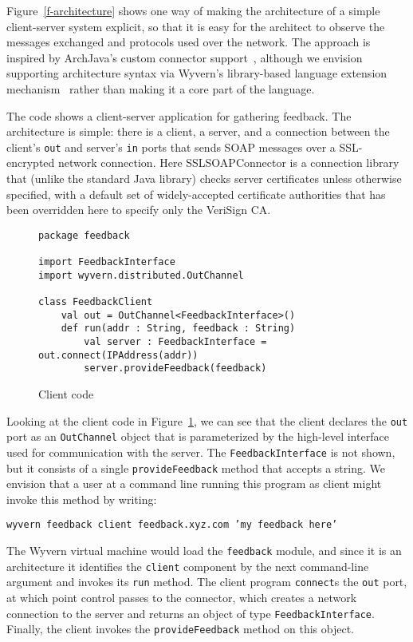 \documentclass[runningheads]{llncs}
\begin{document}
\begin{sloppypar}
Figure~\ref{f-architecture} shows one way of making the architecture of a simple client-server system explicit, so that it is easy for the architect to observe the messages exchanged and protocols used over the network.  The approach is inspired by ArchJava's custom connector support~\cite{ASCN03}, although we envision supporting architecture syntax via Wyvern's library-based language extension mechanism~\cite{TSLs-ECOOP14} rather than making it a core part of the language.

The code shows a client-server application for gathering feedback.  The architecture is simple: there is a client, a server, and a connection between the client's \texttt{out} and server's \texttt{in} ports that sends SOAP messages over a SSL-encrypted network connection.  Here SSLSOAPConnector is a connection library that (unlike the standard Java library) checks server certificates unless otherwise specified, with a default set of widely-accepted certificate authorities that has been overridden here to specify only the VeriSign CA.



\begin{figure}[t]
\begin{lstlisting}
package feedback

import FeedbackInterface
import wyvern.distributed.OutChannel

class FeedbackClient
    val out = OutChannel<FeedbackInterface>()
    def run(addr : String, feedback : String)
        val server : FeedbackInterface = out.connect(IPAddress(addr))
        server.provideFeedback(feedback)
\end{lstlisting}
\caption{Client code}
\label{f-client}
\end{figure}


Looking at the client code in Figure~\ref{f-client}, we can see that the client declares the \texttt{out} port as an \texttt{OutChannel} object that is parameterized by the high-level interface used for communication with the server.  The \texttt{FeedbackInterface} is not shown, but it consists of a single \texttt{provideFeedback} method that accepts a string.  We envision that a user at a command line running this program as client might invoke this method by writing:

\texttt{wyvern feedback client feedback.xyz.com 'my feedback here'}

The Wyvern virtual machine would load the \texttt{feedback} module, and since it is an architecture it identifies the \texttt{client} component by the next command-line argument and invokes its \texttt{run} method.  The client program \texttt{connect}s the \texttt{out} port, at which point control passes to the connector, which creates a network connection to the server and returns an object of type \texttt{FeedbackInterface}.  Finally, the client invokes the \texttt{provideFeedback} method on this object.



\end{sloppypar}
\end{document}

